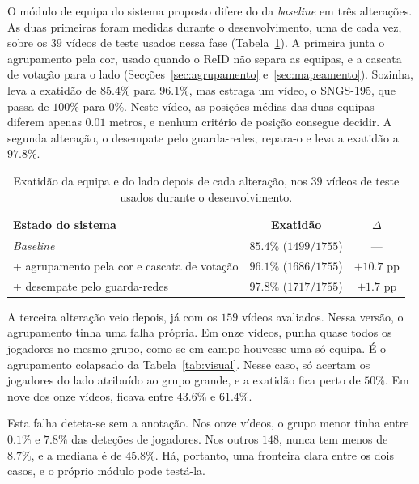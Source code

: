 O módulo de equipa do sistema proposto difere do da \emph{baseline} em três alterações. As duas primeiras foram medidas durante o desenvolvimento, uma de cada vez, sobre os $39$ vídeos de teste usados nessa fase (Tabela~\ref{tab:team-resultados}). A primeira junta o agrupamento pela cor, usado quando o ReID não separa as equipas, e a cascata de votação para o lado (Secções~\ref{sec:agrupamento} e~\ref{sec:mapeamento}). Sozinha, leva a exatidão de $85.4\%$ para $96.1\%$, mas estraga um vídeo, o SNGS-195, que passa de $100\%$ para $0\%$. Neste vídeo, as posições médias das duas equipas diferem apenas $0.01$ metros, e nenhum critério de posição consegue decidir. A segunda alteração, o desempate pelo guarda-redes, repara-o e leva a exatidão a $97.8\%$.

\begin{table}[H]
    \centering
    \caption{Exatidão da equipa e do lado depois de cada alteração, nos $39$ vídeos de teste usados durante o desenvolvimento.}
    \label{tab:team-resultados}
    \begin{tabular}{|l|c|c|}
        \hline
        \textbf{Estado do sistema} & \textbf{Exatidão} & \textbf{$\Delta$} \\
        \hline
        \emph{Baseline}                                   & $85.4\%$ ($1499/1755$) & --- \\
        \hline
        + agrupamento pela cor e cascata de votação       & $96.1\%$ ($1686/1755$) & $+10.7$ pp \\
        \hline
        + desempate pelo guarda-redes           & $97.8\%$ ($1717/1755$) & $+1.7$ pp \\
        \hline
    \end{tabular}
\end{table}

A terceira alteração veio depois, já com os $159$ vídeos avaliados. Nessa versão, o agrupamento tinha uma falha própria. Em onze vídeos, punha quase todos os jogadores no mesmo grupo, como se em campo houvesse uma só equipa. É o agrupamento colapsado da Tabela~\ref{tab:visual}. Nesse caso, só acertam os jogadores do lado atribuído ao grupo grande, e a exatidão fica perto de $50\%$. Em nove dos onze vídeos, ficava entre $43.6\%$ e $61.4\%$.

Esta falha deteta-se sem a anotação. Nos onze vídeos, o grupo menor tinha entre $0.1\%$ e $7.8\%$ das deteções de jogadores. Nos outros $148$, nunca tem menos de $8.7\%$, e a mediana é de $45.8\%$. Há, portanto, uma fronteira clara entre os dois casos, e o próprio módulo pode testá-la.


